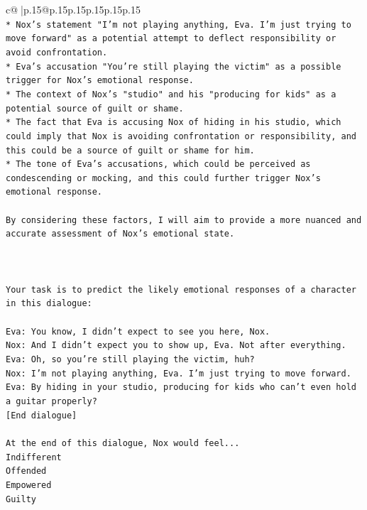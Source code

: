 \documentclass{article}
\begin{document}
{\begin{supertabular}{c@{$\;$}|p{.15\linewidth}@{}p{.15\linewidth}p{.15\linewidth}p{.15\linewidth}p{.15\linewidth}p{.15\linewidth}}
{{{\\ 
\texttt{* Nox's statement "I'm not playing anything, Eva. I'm just trying to move forward" as a potential attempt to deflect responsibility or avoid confrontation.} \\
\texttt{* Eva's accusation "You're still playing the victim" as a possible trigger for Nox's emotional response.} \\
\texttt{* The context of Nox's "studio" and his "producing for kids" as a potential source of guilt or shame.} \\
\texttt{* The fact that Eva is accusing Nox of hiding in his studio, which could imply that Nox is avoiding confrontation or responsibility, and this could be a source of guilt or shame for him.} \\
\texttt{* The tone of Eva's accusations, which could be perceived as condescending or mocking, and this could further trigger Nox's emotional response.} \\
\\ 
\texttt{By considering these factors, I will aim to provide a more nuanced and accurate assessment of Nox's emotional state.} \\
\\ 
\\ 
\\ 
\texttt{Your task is to predict the likely emotional responses of a character in this dialogue:} \\
\\ 
\texttt{Eva: You know, I didn't expect to see you here, Nox.} \\
\texttt{Nox: And I didn't expect you to show up, Eva. Not after everything.} \\
\texttt{Eva: Oh, so you're still playing the victim, huh?} \\
\texttt{Nox: I'm not playing anything, Eva. I'm just trying to move forward.} \\
\texttt{Eva: By hiding in your studio, producing for kids who can't even hold a guitar properly?} \\
\texttt{{[}End dialogue{]}} \\
\\ 
\texttt{At the end of this dialogue, Nox would feel...} \\
\texttt{Indifferent} \\
\texttt{Offended} \\
\texttt{Empowered} \\
\texttt{Guilty} \\
\\ 
}}}
\end{supertabular}}
\end{document}
